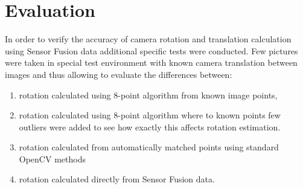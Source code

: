 \section{Evaluation}
In order to verify the accuracy of camera rotation and translation calculation using Sensor Fusion data additional specific tests were conducted. Few pictures were taken in special test environment with known camera translation between images and thus allowing to evaluate the differences between:
\begin{enumerate}
\item rotation calculated using 8-point algorithm from known image points,
\item rotation calculated using 8-point algorithm where to known points few outliers were added to see how exactly this affects rotation estimation.
\item rotation calculated from automatically matched points using standard OpenCV methods
\item rotation calculated directly from Sensor Fusion data.
\end{enumerate}
